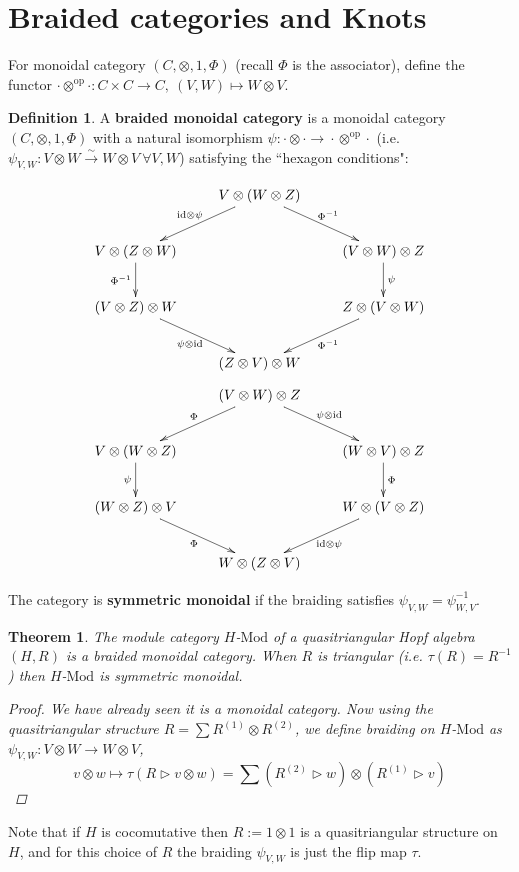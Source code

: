 \documentclass[11pt]{article}
\newcommand{\bb}{\medbreak}
\newcommand{\nt}{\noindent}
\newcommand{\rt}{\xrightarrow{}}
\newcommand{\xrt}{\xrightarrow}
\newcommand{\cd}{\cdot}
\newcommand{\id}{\text{id}}
\newcommand{\Mod}{\text{Mod}}
\newcommand{\op}{\text{op}}
\newcommand{\define}[1]{\textbf{#1}}
\newtheorem{theorem}[lemma]{Theorem}
\theoremstyle{definition}
\newtheorem{definition}[lemma]{Definition}
\begin{document}
\section{Braided categories and Knots}
For monoidal category $(C,\otimes,1,\Phi)$ (recall $\Phi$ is the associator), define the functor $\cd \otimes^{\op}\cd:C\times C\rt C,\ (V,W)\mapsto W\otimes V$. 

\begin{definition} A \define{braided monoidal category} is a monoidal category $(C,\otimes,1,\Phi)$ with a natural isomorphism $\psi: \cd \otimes \cd \rt \cd \otimes^{\text{op}}\cd $ (i.e. $\psi_{V,W}:V\otimes W \xrt{\sim} W\otimes V\ \forall V,W$) satisfying the ``hexagon conditions":
\begin{useimager}
$$\xymatrix{
  & V\otimes (W\otimes Z) \ar[ld]_{\id\otimes \psi} \ar[rd]^{\Phi^{-1}} & \\
V\otimes (Z\otimes W) \ar[d]_{\Phi^{-1}} & & (V\otimes W)\otimes Z \ar[d]^{\psi}\\
(V\otimes Z)\otimes W \ar[rd]_{\psi\otimes \id} & & Z\otimes (V\otimes W) \ar[ld]^{\Phi^{-1}}\\
 & (Z\otimes V)\otimes W & \\
}$$
$$
\xymatrix{
  & (V\otimes W)\otimes Z \ar[ld]_{\Phi} \ar[rd]^{\psi\otimes \id} & \\
V\otimes (W\otimes Z) \ar[d]_{\psi} & & (W\otimes V)\otimes Z \ar[d]^{\Phi}\\
(W\otimes Z)\otimes V \ar[rd]_{\Phi} & & W\otimes (V\otimes Z) \ar[ld]^{\id\otimes \psi}\\
 & W\otimes (Z\otimes V) & \\
}
$$  
\end{useimager}

\nt The category is \define{symmetric monoidal} if the braiding satisfies $\psi_{V,W}=\psi_{W,V}^{-1}$.
\end{definition}

\begin{theorem}\label{hopf_braiding} The module category $H$-$\Mod$ of a quasitriangular Hopf algebra $(H,R)$ is a braided monoidal category. When $R$ is triangular (i.e. $\tau(R)=R^{-1}$) then $H$-$\Mod$ is symmetric monoidal.
\begin{proof}
We have already seen it is a monoidal category. Now using the quasitriangular structure $R=\sum R^{(1)}\otimes R^{(2)}$, we define braiding on $H$-$\Mod$ as $\psi_{V,W}:V\otimes W \rt W\otimes V$,
$$v\otimes w \mapsto \tau(R\rhd v\otimes w)=\sum (R^{(2)}\rhd w)\otimes (R^{(1)}\rhd v)$$
\end{proof}
\end{theorem} 
\nt Note that if $H$ is cocomutative then $R:=1\otimes 1$ is a quasitriangular structure on $H$, and for this choice of $R$ the braiding $\psi_{V,W}$ is just the flip map $\tau$.\bb
\end{document}
